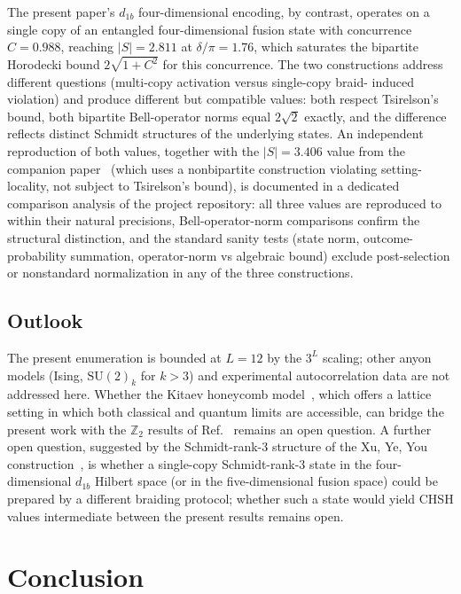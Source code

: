 \documentclass[aps,pra,twocolumn,superscriptaddress,longbibliography,floatfix,nofootinbib]{revtex4-2}
\begin{document}
The present paper's $d_{1b}$ four-dimensional encoding, by contrast,
operates on a single copy of an entangled four-dimensional fusion
state with concurrence $C = 0.988$, reaching $|S| = 2.811$ at
$\delta/\pi = 1.76$, which saturates the bipartite Horodecki bound
$2\sqrt{1+C^2}$ for this concurrence. The two constructions address
different questions (multi-copy activation versus single-copy braid-
induced violation) and produce different but compatible values:
both respect Tsirelson's bound, both bipartite Bell-operator norms
equal $2\sqrt{2}$ exactly, and the difference reflects distinct
Schmidt structures of the underlying states. An independent
reproduction of both values, together with the
$|S| = 3.406$ value from the companion
paper~\cite{Sayim2026chsh} (which uses a nonbipartite
construction violating setting-locality, not subject to Tsirelson's
bound), is documented in
a dedicated comparison analysis of the project
repository: all three values are reproduced to within their natural
precisions, Bell-operator-norm comparisons confirm the structural
distinction, and the standard sanity tests (state norm,
outcome-probability summation, operator-norm vs algebraic bound)
exclude post-selection or nonstandard normalization in any of the
three constructions.

\subsection{Outlook}

The present enumeration is bounded at $L=12$ by the $3^L$ scaling;
other anyon models (Ising, $\text{SU}(2)_k$ for $k>3$) and experimental
autocorrelation data are not addressed here.
Whether the Kitaev honeycomb model~\cite{Kitaev2006}, which offers a
lattice setting in which both classical and quantum limits are accessible,
can bridge the present work with the $\mathbb{Z}_2$ results of
Ref.~\cite{Sayim2026topological} remains an open question.
A further open question, suggested by the Schmidt-rank-3 structure
of the Xu, Ye, You construction~\cite{Xu2025}, is whether a
single-copy Schmidt-rank-3 state in the four-dimensional $d_{1b}$
Hilbert space (or in the five-dimensional fusion space) could be
prepared by a different braiding protocol; whether such a state would
yield CHSH values intermediate between the present results remains open.

\section{Conclusion}
\label{sec:conclusion}
\end{document}
